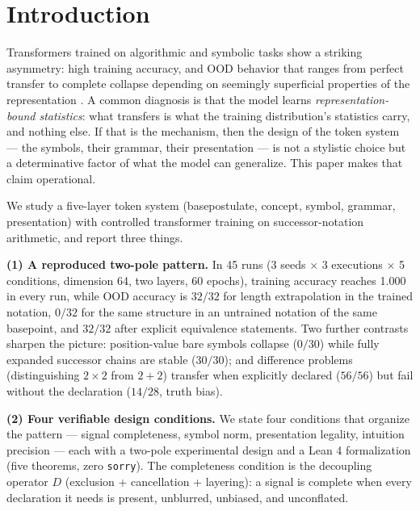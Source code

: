\documentclass{article} %
\begin{document}
\section{Introduction}

Transformers trained on algorithmic and symbolic tasks show a
striking asymmetry: high training accuracy, and OOD behavior that
ranges from perfect transfer to complete collapse depending on
seemingly superficial properties of the representation
\citep{power2022grokking, deletang2022chomsky,
lake2018generalization, keysers2020measuring,
hupkes2020compositionality, bahdanau2019systematic,
anil2022exploring, jelassi2023length, raffel2020exploring,
saxton2019analysing, lample2020deep, hendrycks2021measuring,
razeghi2022impact}. A common diagnosis is that the model learns
\emph{representation-bound statistics}: what transfers is what the
training distribution's statistics carry, and nothing else. If that
is the mechanism, then the design of the token system --- the
symbols, their grammar, their presentation --- is not a stylistic
choice but a determinative factor of what the model can
generalize. This paper makes that claim operational.

We study a five-layer token system (basepostulate, concept, symbol,
grammar, presentation) with controlled transformer training on
successor-notation arithmetic, and report three things.

\textbf{(1) A reproduced two-pole pattern.} In 45 runs (3 seeds
$\times$ 3 executions $\times$ 5 conditions, dimension 64, two
layers, 60 epochs), training accuracy reaches 1.000 in every run,
while OOD accuracy is $32/32$ for length extrapolation in the
trained notation, $0/32$ for the same structure in an untrained
notation of the same basepoint, and $32/32$ after explicit
equivalence statements. Two further contrasts sharpen the picture:
position-value bare symbols collapse ($0/30$) while fully expanded
successor chains are stable ($30/30$); and difference problems
(distinguishing $2 \times 2$ from $2 + 2$) transfer when explicitly
declared ($56/56$) but fail without the declaration ($14/28$, truth
bias).

\textbf{(2) Four verifiable design conditions.} We state four
conditions that organize the pattern --- signal completeness,
symbol norm, presentation legality, intuition precision --- each
with a two-pole experimental design and a Lean 4 formalization
(five theorems, zero \texttt{sorry}). The completeness condition is
the decoupling operator $D$ (exclusion + cancellation + layering):
a signal is complete when every declaration it needs is present,
unblurred, unbiased, and unconflated.
\end{document}
